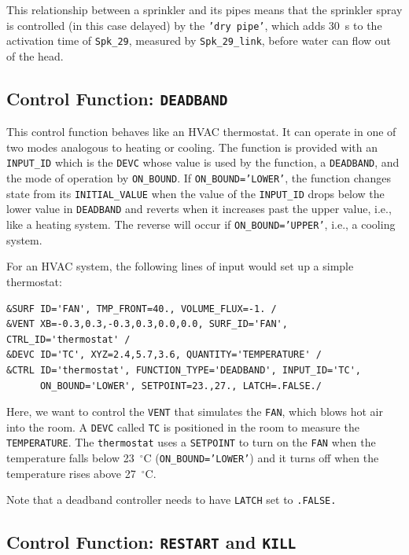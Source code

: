\documentclass[11pt]{book}
\newcommand{\ct}{\tt\small}
\begin{document}
\noindent
This relationship between a sprinkler and its pipes means that the sprinkler spray is controlled (in this case delayed) by the
{\ct 'dry pipe'}, which adds 30~s to the activation time of {\ct Spk\_29}, measured by  {\ct Spk\_29\_link},
before water can flow out of the head.


\subsection{Control Function: \texorpdfstring{{\tt DEADBAND}}{DEADBAND}}
\label{info:DEADBAND}

This control function behaves like an HVAC thermostat.  It can operate in one of two modes analogous to heating or cooling.
The function is provided with an {\ct INPUT\_ID} which is the {\ct DEVC} whose value is used by the function,
a {\ct DEADBAND}, and the mode of operation by {\ct ON\_BOUND}.  If  {\ct ON\_BOUND='LOWER'},
the function changes state from its {\ct INITIAL\_VALUE} when the value of the {\ct INPUT\_ID} drops
below the lower value in {\ct DEADBAND} and reverts when it increases past the upper value, i.e., like a heating system.
The reverse will occur if {\ct ON\_BOUND='UPPER'}, i.e., a cooling system.

For an HVAC system, the following lines of input would set up a simple thermostat:

\footnotesize
\begin{verbatim}
&SURF ID='FAN', TMP_FRONT=40., VOLUME_FLUX=-1. /
&VENT XB=-0.3,0.3,-0.3,0.3,0.0,0.0, SURF_ID='FAN', CTRL_ID='thermostat' /
&DEVC ID='TC', XYZ=2.4,5.7,3.6, QUANTITY='TEMPERATURE' /
&CTRL ID='thermostat', FUNCTION_TYPE='DEADBAND', INPUT_ID='TC',
      ON_BOUND='LOWER', SETPOINT=23.,27., LATCH=.FALSE./
\end{verbatim} \normalsize

\noindent
Here, we want to control the {\ct VENT} that simulates the {\ct FAN}, which blows hot air
into the room. A {\ct DEVC} called {\ct TC} is positioned in the room to measure the {\ct TEMPERATURE}.
The {\ct thermostat} uses a {\ct SETPOINT} to turn on the
{\ct FAN} when the temperature falls below 23~$^\circ$C ({\ct ON\_BOUND='LOWER'})
and it turns off when the temperature rises above 27~$^\circ$C.

\begin{warning}
Note that a deadband controller needs to have {\ct LATCH} set to {\ct .FALSE.}
\end{warning}

\subsection{Control Function: \texorpdfstring{{\tt RESTART} and {\tt KILL}} {RESTARTKILL} }
\end{document}
